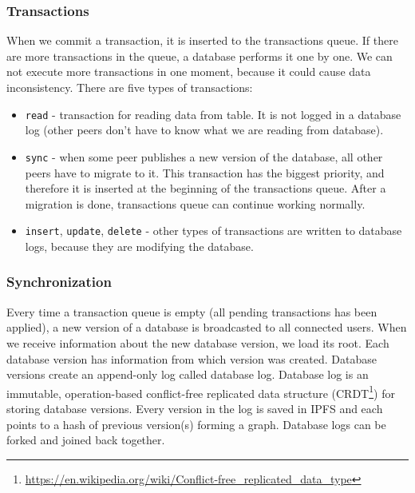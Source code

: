 \subsubsection{Transactions}
When we commit a transaction, it is inserted to the transactions queue. If there are more transactions in the queue, a database performs it one by one. We can not execute more transactions in one moment, because it could cause data inconsistency. There are five types of transactions:
\begin{itemize}
    \item \texttt{read} - transaction for reading data from table. It is not logged in a database log (other peers don't have to know what we are reading from database).
    \item \texttt{sync} - when some peer publishes a new version of the database, all other peers have to migrate to it. This transaction has the biggest priority, and therefore it is inserted at the beginning of the transactions queue. After a migration is done, transactions queue can continue working normally.
    \item \texttt{insert}, \texttt{update}, \texttt{delete} - other types of transactions are written to database logs, because they are modifying the database.
\end{itemize}

\subsubsection{Synchronization} 
Every time a transaction queue is empty (all pending transactions has been applied), a new version of a database is broadcasted to all connected users. When we receive information about the new database version, we load its root. Each database version has information from which version was created. Database versions create an append-only log called database log. Database log is an immutable, operation-based conflict-free replicated data structure (CRDT\footnote{\url{https://en.wikipedia.org/wiki/Conflict-free_replicated_data_type}}) for storing database versions. Every version in the log is saved in IPFS and each points to a hash of previous version(s) forming a graph. Database logs can be forked and joined back together.\cite{crdtLog}

